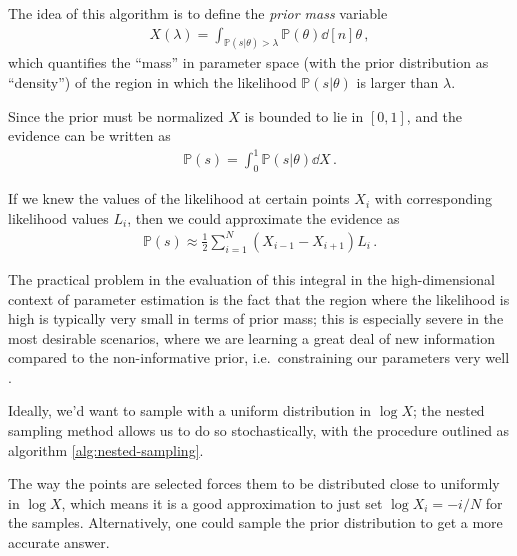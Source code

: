 \documentclass[main.tex]{subfiles}
\begin{document}
The idea of this algorithm is to define the \emph{prior mass} variable 
%
\begin{align}
X(\lambda ) = \int_{\mathbb{P}(s | \theta) > \lambda } \mathbb{P}(\theta) \dd[n]{\theta }
\,,
\end{align}
%
which quantifies the ``mass'' in parameter space (with the prior distribution as ``density'') of the region in which the likelihood \(\mathbb{P}(s | \theta )\) is larger than \(\lambda \). 

Since the prior must be normalized \(X\) is bounded to lie in \([0, 1]\), and the evidence can be written as 
%
\begin{align}
\mathbb{P}(s) = \int_{0}^{1} \mathbb{P}(s | \theta ) \dd{X}
\,.
\end{align}

If we knew the values of the likelihood at certain points \(X_i\) with corresponding likelihood values \(L_i\), then we could approximate the evidence as 
%
\begin{align}
\mathbb{P}(s) \approx \frac{1}{2} \sum _{i=1}^{N} (X_{i-1} - X_{i+1}) L_i
\,.
\end{align}

The practical problem in the evaluation of this integral in the high-dimensional context of parameter estimation is the fact that the region where the likelihood is high is typically very small in terms of prior mass; this is especially severe in the most desirable scenarios, where we are learning a great deal of new information compared to the non-informative prior, i.e.\ constraining our parameters very well \cite[sec.\ 4]{skillingNestedSamplingGeneral2006}.

Ideally, we'd want to sample with a uniform distribution in \(\log X\); 
the nested sampling method allows us to do so stochastically, with the procedure outlined as algorithm \ref{alg:nested-sampling}. 

The way the points are selected forces them to be distributed close to uniformly in \(\log X\), which means it is a good approximation to just set \(\log X_i = - i / N\) for the samples. 
Alternatively, one could sample the prior distribution to get a more accurate answer. 
\end{document}
